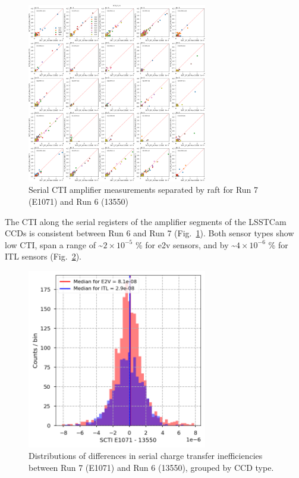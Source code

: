 \begin{figure}[ht]
\begin{centering}
\includegraphics[width=0.7\textwidth]{figures/baselineCharacterization/13550_E1071_SCTI_EF_43_inset.png}
	\caption{Serial CTI amplifier measurements separated by raft for Run 7 (E1071) and Run 6 (13550)\label{fig:serial-cti}}
\end{centering}
\end{figure}

The CTI along the serial registers of the amplifier segments of the LSSTCam CCDs is consistent between Run 6 and
Run 7 (Fig.~\ref{fig:serial-cti}). Both sensor types show low CTI,
span a range  of \textasciitilde$2 \times 10^{-5}$ \% for e2v sensors, and
by \textasciitilde$4 \times 10^{-6}$  \% for ITL sensors (Fig.~\ref{fig:serial-cti-dist}).

\begin{figure}[ht]
\begin{centering}
\includegraphics[width=0.7\textwidth]{figures/baselineCharacterization/SCTI_13550_E1071_diff.png}
\caption{Distributions of differences in serial charge transfer inefficiencies between Run 7 (E1071) and Run 6 (13550), grouped by CCD type.}
\label{fig:serial-cti-dist}
\end{centering}
\end{figure}

